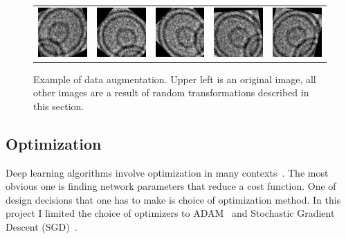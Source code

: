 \documentclass[a4paper, 11pt, table]{article}
\begin{document}
\begin{figure}[H]
\begin{tabular}{ccccc}
\includegraphics[scale=0.5]{augmented/_0_7140.jpeg} & \includegraphics[scale=0.5]{augmented/_0_7746.jpeg} & \includegraphics[scale=0.5]{augmented/_0_8553.jpeg} & \includegraphics[scale=0.5]{augmented/_0_8763.jpeg} & \includegraphics[scale=0.5]{augmented/_0_9361.jpeg} 
	
\end{tabular}
\caption{Example of data augmentation. Upper left is an original image, all other images are a result of random transformations described in this section.}
\label{fig:augmented_images}
\end{figure}

\subsection{Optimization}
Deep learning algorithms involve optimization in many contexts~\cite{dl_book}. The most obvious one is finding network parameters that reduce a cost function. One of design decisions that one has to make is choice of optimization method. In this project I limited the choice of optimizers to ADAM~\cite{DBLP:journals/corr/KingmaB14} and Stochastic Gradient Descent (SGD)~\cite{Zhang04solvinglarge}.
\end{document}
